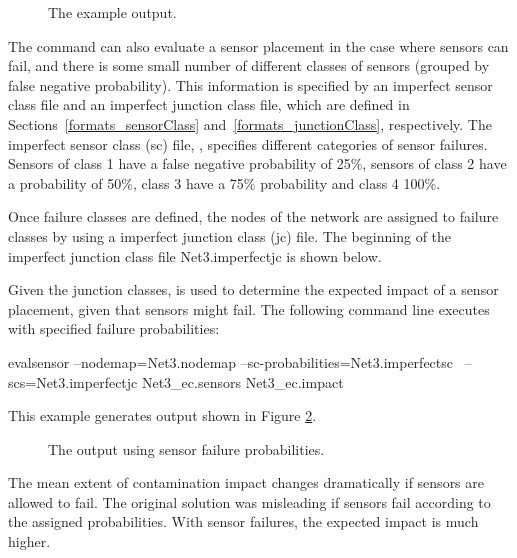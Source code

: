 \begin{figure}[h]
  \caption{The  example output.}
  \label{fig:evalsensor_ex1_screen_output}
\end{figure}

The  command can also evaluate a sensor placement in the 
case where sensors can fail, and there is some small number of different classes 
of sensors (grouped by false negative probability). This information is specified 
by an imperfect sensor class file and an imperfect junction class file, which are defined in 
Sections~\ref{formats_sensorClass} and~\ref{formats_junctionClass}, 
respectively. The imperfect sensor class (sc) file, , specifies different 
categories of sensor failures. Sensors of class 1 have a 
false negative probability of 25\%, sensors of class 2 have a probability of 50\%, 
class 3 have a 75\% probability and class 4 100\%. 



Once failure classes are defined, the nodes of the network are assigned 
to failure classes by using a imperfect junction class (jc) file. The beginning of the 
imperfect junction class file Net3.imperfectjc is shown below.



Given the junction classes,  is used to determine the 
expected impact of a sensor placement, given that sensors might fail. 
The following command line executes  with specified failure probabilities:

\begin{unknownListing}
evalsensor --nodemap=Net3.nodemap --sc-probabilities=Net3.imperfectsc \
    --scs=Net3.imperfectjc Net3_ec.sensors Net3_ec.impact
\end{unknownListing}

This example generates output shown in Figure \ref{fig:evalsensor_ex2_screen_output}.

\begin{figure}[h]
  \caption{The \code{evalsensor} output using sensor failure probabilities.}
  \label{fig:evalsensor_ex2_screen_output}
\end{figure}

The mean extent of contamination impact changes dramatically 
if sensors are allowed to fail. The original solution was 
misleading if sensors fail according to the assigned probabilities. 
With sensor failures, the expected impact is much higher.
